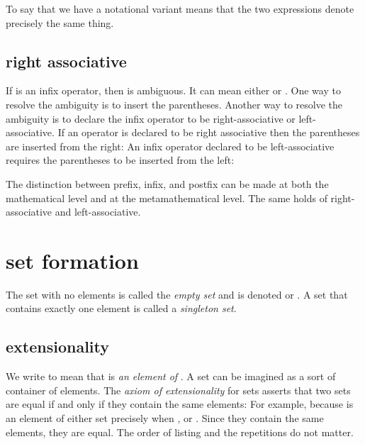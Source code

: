 \documentclass[cup9a]{cupbook}
\begin{document}
To say that we have a notational variant means that the two expressions denote precisely the same thing.  


\subsection{right associative}

If \mc{$*$} is an infix operator, then  is ambiguous.  It can mean
either  or .  One way to resolve the ambiguity is to insert the parentheses.  Another way to resolve the ambiguity is to declare the infix operator to  be right-associative or left-associative.  If an operator is
declared to be right associative then the parentheses are inserted from the right:
An infix operator declared to be left-associative requires the parentheses to be inserted from the left:

The distinction between prefix, infix, and postfix can be made at both the mathematical level and at the metamathematical level.  The same holds of right-associative and left-associative.



\section{set formation}

The set with no elements is called the {\it empty set} and is denoted \mc{$\emptyset$} or \mc{$\{\}$}.
A set  that contains exactly one element  is called a {\it singleton set}. 

\subsection{extensionality}

We write  to mean that  is {\it an element of} .  A set can be imagined as a sort of container of elements.  The {\it axiom of extensionality} for sets asserts that two sets are equal if and only if they contain the same elements:
For example,
because  is an element of either set precisely when , or .
Since they contain the same elements, they are equal.  The order of listing and the repetitions do not matter.
\end{document}
